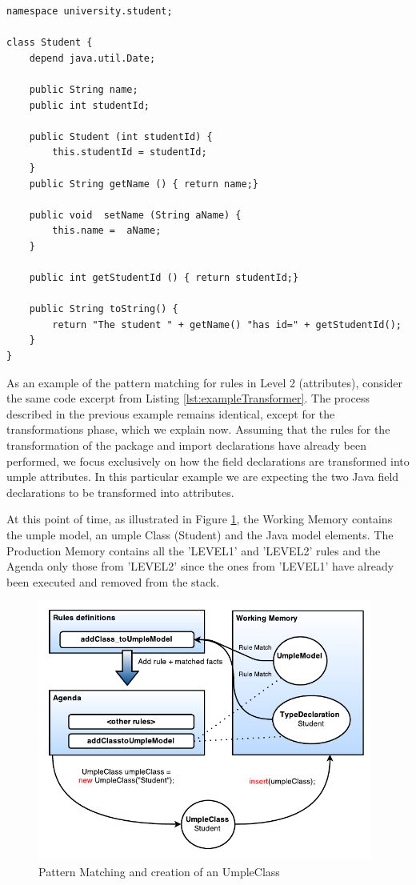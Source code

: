 \begin{lstlisting}[style=umpleOut, label=lst:level1exampleGenerator, caption=Umple code generated -- Level 1]
namespace university.student;

class Student {
	depend java.util.Date;
	
    public String name;
    public int studentId;
    
    public Student (int studentId) {
    	this.studentId = studentId;
    }
    public String getName () { return name;}
    
    public void  setName (String aName) { 
    	this.name =  aName;
    }
   
    public int getStudentId () { return studentId;}
    
    public String toString() {
    	return "The student " + getName() "has id=" + getStudentId();
    }
}   
\end{lstlisting}

As an example of the pattern matching for rules in Level 2 (attributes), consider the same code excerpt from Listing \ref{lst:exampleTransformer}. The process described in the previous example remains identical, except for the transformations phase, which we explain now. Assuming that the rules for the transformation of the package and import declarations have already been performed, we focus exclusively on how the field declarations are transformed into umple attributes. In this particular example we are expecting the two Java field declarations to be transformed into attributes. 

At this point of time, as illustrated in Figure \ref{fig:ruleModel2}, the Working Memory contains the umple model, an umple Class (Student) and the Java model elements. The Production Memory contains all the 'LEVEL1' and 'LEVEL2' rules and the Agenda only those from 'LEVEL2' since the ones from 'LEVEL1' have already been executed and removed from the stack.

\begin{figure}[h]
\centering
\includegraphics[width=0.98\textwidth]{Figures/ruleModel.pdf}
\caption{Pattern Matching and creation of an UmpleClass}
\label{fig:ruleModel2}
\end{figure}

